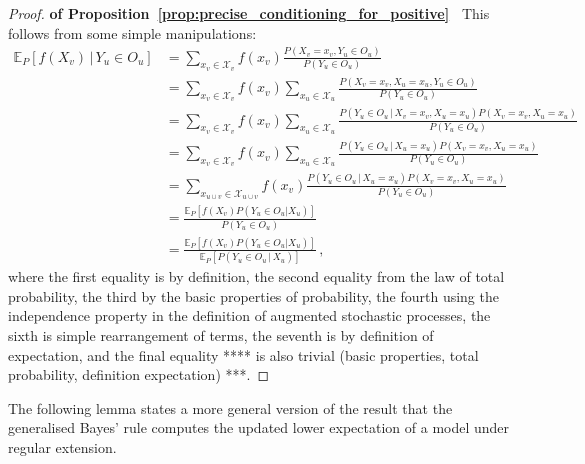 \documentclass[twoside,11pt]{article}
\newcommand{\states}{\mathcal{X}}
\begin{document}
\begin{proof}{\bf of Proposition~\ref{prop:precise_conditioning_for_positive}~}
This follows from some simple manipulations:
\begin{align*}
\mathbb{E}_P[f(X_v)\,\vert\,Y_u\in O_u] &= \sum_{x_v\in\states_v} f(x_v)\frac{P(X_v=x_v, Y_u\in O_u)}{P(Y_u\in O_u)} \\
 &= \sum_{x_v\in\states_v} f(x_v)\sum_{x_u\in\states_u}\frac{P(X_v=x_v, X_u=x_u, Y_u\in O_u)}{P(Y_u\in O_u)} \\
 &= \sum_{x_v\in\states_v} f(x_v)\sum_{x_u\in\states_u}\frac{P(Y_u\in O_u\,\vert\,X_v=x_v, X_u=x_u)P(X_v=x_v, X_u=x_u)}{P(Y_u\in O_u)} \\
 &= \sum_{x_v\in\states_v} f(x_v)\sum_{x_u\in\states_u}\frac{P(Y_u\in O_u\,\vert\,X_u=x_u)P(X_v=x_v, X_u=x_u)}{P(Y_u\in O_u)} \\
 &= \sum_{x_{u\cup v}\in\states_{u\cup v}} f(x_v)\frac{P(Y_u\in O_u\,\vert\,X_u=x_u)P(X_v=x_v, X_u=x_u)}{P(Y_u\in O_u)} \\
 &= \frac{\mathbb{E}_P[f(X_v)P(Y_u\in O_u\vert X_u)]}{P(Y_u\in O_u)} \\
 &= \frac{\mathbb{E}_P[f(X_v)P(Y_u\in O_u\vert X_u)]}{\mathbb{E}_P[P(Y_u\in O_u\,\vert\,X_u)]}\,,
\end{align*}
where the first equality is by definition, the second equality from the law of total probability, the third by the basic properties of probability, the fourth using the independence property in the definition of augmented stochastic processes, the sixth is simple rearrangement of terms, the seventh is by definition of expectation, and the final equality **** is also trivial (basic properties, total probability, definition expectation) ***.
\end{proof}

The following lemma states a more general version of the result that the generalised Bayes' rule computes the updated lower expectation of a model under regular extension.
\end{document}
